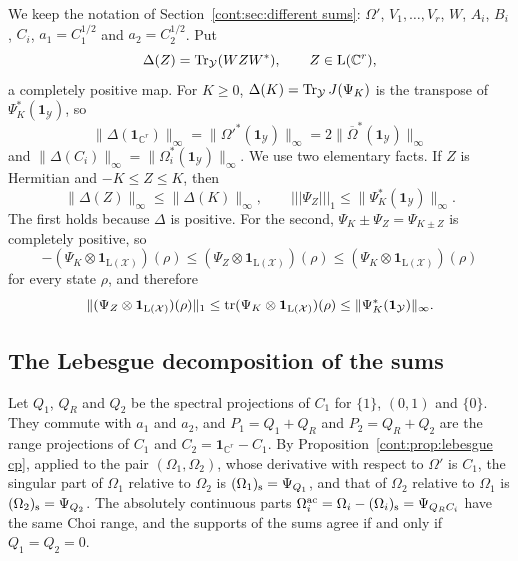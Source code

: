We keep the notation of Section~\ref{cont:sec:different sums}: $\Omega'$, $V_1,\dots,V_r$, $W$, $A_i$, $B_i$, $C_i$, $a_1=C_1^{1/2}$ and $a_2=C_2^{1/2}$. Put
\[
\Delta(Z)=\operatorname{Tr}_{\mathcal{Y}}(WZW^*),\qquad Z\in\mathrm{L}(\mathbb{C}^r),
\]
a completely positive map. For $K\geq0$, $\Delta(K)=\operatorname{Tr}_{\mathcal{Y}}J(\Psi_K)$ is the transpose of $\Psi_K^*(\mathbf{1}_{\mathcal{Y}})$, so
\[
\|\Delta(\mathbf{1}_{\mathbb{C}^r})\|_\infty=\|\Omega'^*(\mathbf{1}_{\mathcal{Y}})\|_\infty=2\|\overline{\Omega}^*(\mathbf{1}_{\mathcal{Y}})\|_\infty
\]
and $\|\Delta(C_i)\|_\infty=\|\Omega_i^*(\mathbf{1}_{\mathcal{Y}})\|_\infty$. We use two elementary facts. If $Z$ is Hermitian and $-K\leq Z\leq K$, then
\begin{equation}\label{cont:eq:cp domination}
\|\Delta(Z)\|_\infty\leq\|\Delta(K)\|_\infty,\qquad|||\Psi_Z|||_1\leq\|\Psi_K^*(\mathbf{1}_{\mathcal{Y}})\|_\infty .
\end{equation}
The first holds because $\Delta$ is positive. For the second, $\Psi_K\pm\Psi_Z=\Psi_{K\pm Z}$ is completely positive, so
\[
-(\Psi_K\otimes\mathbf{1}_{\mathrm{L}(\mathcal{X})})(\rho)\leq(\Psi_Z\otimes\mathbf{1}_{\mathrm{L}(\mathcal{X})})(\rho)\leq(\Psi_K\otimes\mathbf{1}_{\mathrm{L}(\mathcal{X})})(\rho)
\]
for every state $\rho$, and therefore
\[
\|(\Psi_Z\otimes\mathbf{1}_{\mathrm{L}(\mathcal{X})})(\rho)\|_1\leq\operatorname{tr}(\Psi_K\otimes\mathbf{1}_{\mathrm{L}(\mathcal{X})})(\rho)\leq\|\Psi_K^*(\mathbf{1}_{\mathcal{Y}})\|_\infty.
\]


\subsection{The Lebesgue decomposition of the sums}

Let $Q_1$, $Q_R$ and $Q_2$ be the spectral projections of $C_1$ for $\{1\}$, $(0,1)$ and $\{0\}$. They commute with $a_1$ and $a_2$, and $P_1=Q_1+Q_R$ and $P_2=Q_R+Q_2$ are the range projections of $C_1$ and $C_2=\mathbf{1}_{\mathbb{C}^r}-C_1$. By Proposition~\ref{cont:prop:lebesgue cp}, applied to the pair $(\Omega_1,\Omega_2)$, whose derivative with respect to $\Omega'$ is $C_1$, the singular part of $\Omega_1$ relative to $\Omega_2$ is $(\Omega_1)_{\rm s}=\Psi_{Q_1}$, and that of $\Omega_2$ relative to $\Omega_1$ is $(\Omega_2)_{\rm s}=\Psi_{Q_2}$. The absolutely continuous parts $\Omega_i^{\rm ac}=\Omega_i-(\Omega_i)_{\rm s}=\Psi_{Q_RC_i}$ have the same Choi range, and the supports of the sums agree if and only if $Q_1=Q_2=0$.

